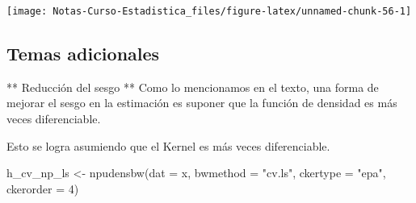 \documentclass[
  12pt,
]{book}
\newenvironment{Shaded}{\begin{snugshade}}{\end{snugshade}}
\newcommand{\AttributeTok}[1]{\textcolor[rgb]{0.77,0.63,0.00}{#1}}
\newcommand{\DecValTok}[1]{\textcolor[rgb]{0.00,0.00,0.81}{#1}}
\newcommand{\FunctionTok}[1]{\textcolor[rgb]{0.00,0.00,0.00}{#1}}
\newcommand{\NormalTok}[1]{#1}
\newcommand{\OtherTok}[1]{\textcolor[rgb]{0.56,0.35,0.01}{#1}}
\newcommand{\SpecialCharTok}[1]{\textcolor[rgb]{0.00,0.00,0.00}{#1}}
\newcommand{\StringTok}[1]{\textcolor[rgb]{0.31,0.60,0.02}{#1}}
\theoremstyle{definition}
\theoremstyle{definition}
\theoremstyle{definition}
\theoremstyle{definition}
\theoremstyle{remark}
\begin{document}
\begin{Shaded}
\end{Shaded}

\begin{center}\texttt{[image: Notas-Curso-Estadistica\_files/figure-latex/unnamed-chunk-56-1]} \end{center}

\hypertarget{temas-adicionales}{%
\subsection{Temas adicionales}\label{temas-adicionales}}

** Reducción del sesgo ** Como lo mencionamos en el texto, una forma
de mejorar el sesgo en la estimación es suponer que la función de
densidad es más veces diferenciable.

Esto se logra asumiendo que el Kernel es más veces diferenciable.

\begin{Shaded}
\begin{Highlighting}[]
\NormalTok{h\_cv\_np\_ls }\OtherTok{\textless{}{-}} \FunctionTok{npudensbw}\NormalTok{(}\AttributeTok{dat =}\NormalTok{ x, }\AttributeTok{bwmethod =} \StringTok{"cv.ls"}\NormalTok{,}
    \AttributeTok{ckertype =} \StringTok{"epa"}\NormalTok{, }\AttributeTok{ckerorder =} \DecValTok{4}\NormalTok{)}
\end{Highlighting}
\end{Shaded}
\end{document}
